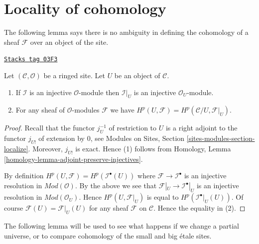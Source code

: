 \section{Locality of cohomology}
\label{sites-cohomology-section-locality}
The following lemma says there is no ambiguity in defining the cohomology
of a sheaf $\mathcal{F}$ over an object of the site.

\begin{lemma}
\label{sites-cohomology-lemma-cohomology-of-open}
\href{https://stacks.math.columbia.edu/tag/03F3}{\texttt{Stacks tag 03F3}}

Let $(\mathcal{C}, \mathcal{O})$ be a ringed site.
Let $U$ be an object of $\mathcal{C}$.
\begin{enumerate}
\item If $\mathcal{I}$ is an injective $\mathcal{O}$-module
then $\mathcal{I}|_U$ is an injective $\mathcal{O}_U$-module.
\item For any sheaf of $\mathcal{O}$-modules $\mathcal{F}$ we have
$H^p(U, \mathcal{F}) = H^p(\mathcal{C}/U, \mathcal{F}|_U)$.
\end{enumerate}
\end{lemma}

\begin{proof}
Recall that the functor $j_U^{-1}$ of restriction to $U$ is a right adjoint
to the functor $j_{U!}$ of extension by $0$, see
Modules on Sites, Section
\ref{sites-modules-section-localize}.
Moreover, $j_{U!}$ is exact. Hence (1) follows from
Homology, Lemma \ref{homology-lemma-adjoint-preserve-injectives}.

\medskip\noindent
By definition $H^p(U, \mathcal{F}) = H^p(\mathcal{I}^\bullet(U))$
where $\mathcal{F} \to \mathcal{I}^\bullet$ is an injective resolution
in $\textit{Mod}(\mathcal{O})$.
By the above we see that $\mathcal{F}|_U \to \mathcal{I}^\bullet|_U$
is an injective resolution in $\textit{Mod}(\mathcal{O}_U)$.
Hence $H^p(U, \mathcal{F}|_U)$ is equal to
$H^p(\mathcal{I}^\bullet|_U(U))$.
Of course $\mathcal{F}(U) = \mathcal{F}|_U(U)$ for
any sheaf $\mathcal{F}$ on $\mathcal{C}$.
Hence the equality in (2).
\end{proof}

The following lemma will be used to see what happens if we change a
partial universe, or to compare cohomology of the small and big \'etale
sites.

